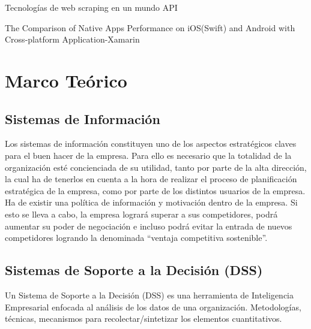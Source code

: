 \documentclass[10pt]{article}
\begin{document}
Tecnologías de web scraping en un mundo API \cite{IEEEreferencias:Ref10}
\par\vspace{\baselineskip}
\justify
The Comparison of Native Apps Performance on iOS(Swift) and Android with Cross-platform Application-Xamarin \cite{IEEEreferencias:Ref11}
\section{Marco Teórico}
\subsection{Sistemas de Información}
\justify
Los sistemas de información constituyen uno de los aspectos estratégicos claves para el buen hacer de la empresa. Para ello es necesario que la totalidad de la organización esté concienciada de su utilidad, tanto por parte de la alta dirección, la cual ha de tenerlos en cuenta a la hora de realizar el proceso de planificación estratégica de la empresa, como por parte de los distintos usuarios de la empresa. Ha de existir una política de información y motivación dentro de la empresa. Si esto se lleva a cabo, la empresa logrará superar a sus competidores, podrá aumentar su poder de negociación e incluso podrá evitar la entrada de nuevos competidores logrando la denominada “ventaja competitiva sostenible”. \par\vspace{\baselineskip}

\subsection{Sistemas de Soporte a la Decisión (DSS)}
\justify
Un Sistema de Soporte a la Decisión (DSS) es una herramienta de Inteligencia Empresarial enfocada al análisis de los datos de una organización.
Metodologías, técnicas, mecanismos para recolectar/sintetizar los elementos cuantitativos. \par\vspace{\baselineskip}
\end{document}

